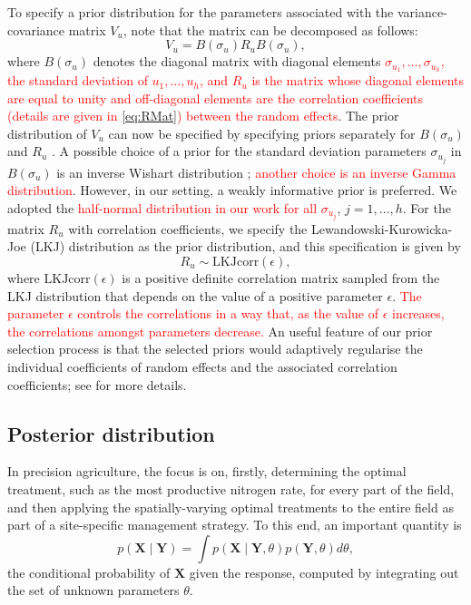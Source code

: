 \documentclass[a4paper]{article}   	%
\begin{document}
	To specify a prior distribution for the parameters associated with the variance-covariance matrix $V_u$, note that the matrix can be decomposed as follows:
	\begin{equation}\label{eq:varmat}
		V_u = B(\sigma_u)R_u B(\sigma_u),
	\end{equation}
	where $B(\sigma_u)$ denotes the diagonal matrix with diagonal elements \textcolor{red}{$\sigma_{u_1},\ldots,\sigma_{u_h}$, the standard deviation of $u_1,\ldots,u_h$, and $R_u$ is the matrix whose diagonal elements are equal to unity and off-diagonal elements are the correlation coefficients (details are given in \eqref{eq:RMat}) between the random effects}. The prior distribution of $V_u$ can now be specified by specifying priors separately for $B(\sigma_u)$ and $R_u$ \parencite{ McElreath2015Statistical}. A possible choice of a prior for the standard deviation parameters $\sigma_{u_j}$ in $B(\sigma_u)$ is an inverse Wishart distribution \parencite{Kass2006Default}; \textcolor{red}{another choice is an inverse Gamma distribution}. However, in our setting, a weakly informative prior is preferred. We adopted the \textcolor{red}{half-normal distribution in our work for all $\sigma_{u_j}$}, $j=1,\ldots,h$. For the matrix $R_u$ with correlation coefficients, we specify the Lewandowski-Kurowicka-Joe (LKJ) distribution \parencite{Lewandowski2009Generating} as the prior distribution, and this specification is given by
	\begin{equation}\label{eq:RPrior}
		R_u \sim \text{LKJcorr}(\epsilon),
	\end{equation}
	where $\text{LKJcorr}(\epsilon)$ is a positive definite correlation matrix sampled from the LKJ distribution that depends on the value of a positive parameter $\epsilon$. \textcolor{red}{The parameter $\epsilon$ controls the correlations in a way that, as the value of $\epsilon$ increases, the correlations amongst parameters decrease.} An useful feature of our prior selection process is that the selected priors would adaptively regularise the individual coefficients of random effects and the associated correlation coefficients; see \textcite{gelman2017Prior, gabry2019Visualization} for more details. 
	
	
	\subsection{Posterior distribution}
	
	In precision agriculture, the focus is on, firstly, determining the optimal treatment, such as the most productive nitrogen rate, for every part of the field, and then applying the spatially-varying optimal treatments to the entire field as part of a site-specific management strategy. To this end, an important quantity is 
	\begin{equation}
		p(\bm{X}\mid \bm{Y}) = \int p(\bm{X}\mid \bm{Y},\theta)p(\bm{Y},\theta)d\theta,
	\end{equation}
	the conditional probability of $\bm{X}$ given the response, computed by integrating out the set of unknown parameters $\theta$. 
	
\end{document}
